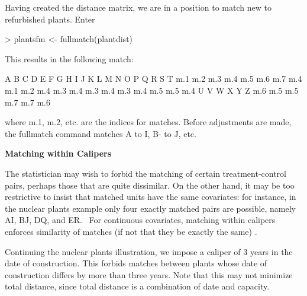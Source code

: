 \documentclass[12pt,twoside]{article}
\begin{document}
{{\bigskip

{\ttfamily
\textrm{Having created the distance matrix, we are in a position to
match new to refurbished plants. Enter}}


\bigskip

\begin{Schunk}
\begin{Sinput}
> plantsfm <- fullmatch(plantdist)
\end{Sinput}
\end{Schunk}

\bigskip

{\ttfamily
\textrm{This results in the following match:}}


\begin{Schunk}
\begin{Soutput}
  A   B   C   D   E   F   G   H   I   J   K   L   M   N   O   P   Q   R   S   T 
m.1 m.2 m.3 m.4 m.5 m.6 m.7 m.4 m.1 m.2 m.4 m.3 m.4 m.3 m.4 m.3 m.4 m.5 m.5 m.4 
  U   V   W   X   Y   Z 
m.6 m.5 m.5 m.7 m.7 m.6 
\end{Soutput}
\end{Schunk}

{\ttfamily
\textrm{where m.1, m.2, etc. are the indices for matches. Before
adjustments are made, the fullmatch command matches A to I, B{}- to J,
etc.}}


\bigskip

{\rmfamily\bfseries
Matching within Calipers}


\bigskip

{\ttfamily
 \textrm{The statistician may wish to forbid the matching of certain
treatment{}-control pairs, perhaps those that are quite dissimilar. On
the other hand, it may be too restrictive to insist that matched units
have the same covariates: for instance, in the nuclear plants example
only four exactly matched pairs are possible, namely AI, BJ, DQ, and
ER. \ For continuous covariates, matching within calipers enforces
similarity of matches (if not that they be exactly the same) 
\citep{hansen:klopfer:2005}. \ }}

{\ttfamily
\textrm{ Continuing the nuclear plants illustration, we impose a caliper
of 3 years in the date of construction. This forbids matches between
plants whose date of construction differs by more than three years.
Note that this may not minimize total distance, since total distance is
a combination of date and capacity.}}


}}
\end{document}
